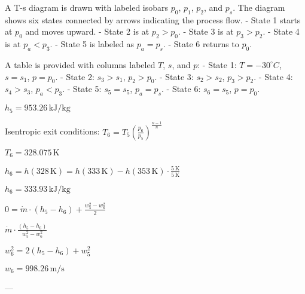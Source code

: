 A T-s diagram is drawn with labeled isobars \( p_0 \), \( p_1 \), \( p_2 \), and \( p_s \). The diagram shows six states connected by arrows indicating the process flow.  
- State 1 starts at \( p_0 \) and moves upward.  
- State 2 is at \( p_2 > p_0 \).  
- State 3 is at \( p_3 > p_2 \).  
- State 4 is at \( p_a < p_3 \).  
- State 5 is labeled as \( p_a = p_s \).  
- State 6 returns to \( p_0 \).  

A table is provided with columns labeled \( T \), \( s \), and \( p \):  
- State 1: \( T = -30^\circ C \), \( s = s_1 \), \( p = p_0 \).  
- State 2: \( s_3 > s_1 \), \( p_2 > p_0 \).  
- State 3: \( s_2 > s_2 \), \( p_3 > p_2 \).  
- State 4: \( s_4 > s_3 \), \( p_a < p_3 \).  
- State 5: \( s_5 = s_5 \), \( p_a = p_s \).  
- State 6: \( s_6 = s_5 \), \( p = p_0 \).

\( h_5 = 953.26 \, \text{kJ/kg} \)  

Isentropic exit conditions:  
\( T_6 = T_5 \left( \frac{p_6}{p_5} \right)^{\frac{n-1}{n}} \)  

\( T_6 = 328.075 \, \text{K} \)  

\( h_6 = h(328 \, \text{K}) = h(333 \, \text{K}) - h(353 \, \text{K}) \cdot \frac{5 \, \text{K}}{5 \, \text{K}} \)  

\( h_6 = 333.93 \, \text{kJ/kg} \)  

\( 0 = \dot{m} \cdot (h_5 - h_6) + \frac{w_5^2 - w_6^2}{2} \)  

\( \dot{m} \cdot \frac{(h_5 - h_6)}{w_5^2 - w_6^2} \)  

\( w_6^2 = 2(h_5 - h_6) + w_5^2 \)  

\( w_6 = 998.26 \, \text{m/s} \)  

---